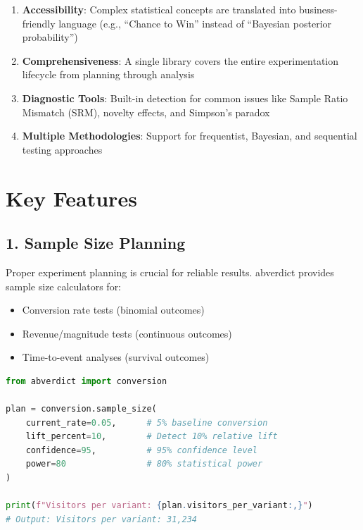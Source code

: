 \documentclass[10pt,a4paper]{article}
\begin{document}
\begin{enumerate}
    \item \textbf{Accessibility}: Complex statistical concepts are translated into business-friendly language (e.g., ``Chance to Win'' instead of ``Bayesian posterior probability'')

    \item \textbf{Comprehensiveness}: A single library covers the entire experimentation lifecycle from planning through analysis

    \item \textbf{Diagnostic Tools}: Built-in detection for common issues like Sample Ratio Mismatch (SRM), novelty effects, and Simpson's paradox

    \item \textbf{Multiple Methodologies}: Support for frequentist, Bayesian, and sequential testing approaches
\end{enumerate}

\section*{Key Features}

\subsection*{1. Sample Size Planning}

Proper experiment planning is crucial for reliable results. abverdict provides sample size calculators for:

\begin{itemize}
    \item Conversion rate tests (binomial outcomes)
    \item Revenue/magnitude tests (continuous outcomes)
    \item Time-to-event analyses (survival outcomes)
\end{itemize}

\begin{lstlisting}[language=Python, caption=Sample size calculation example]
from abverdict import conversion

plan = conversion.sample_size(
    current_rate=0.05,      # 5% baseline conversion
    lift_percent=10,        # Detect 10% relative lift
    confidence=95,          # 95% confidence level
    power=80                # 80% statistical power
)

print(f"Visitors per variant: {plan.visitors_per_variant:,}")
# Output: Visitors per variant: 31,234
\end{lstlisting}
\end{document}
